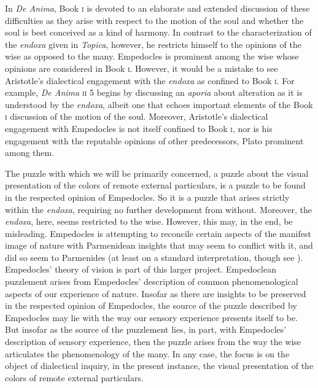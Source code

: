 In \emph{De Anima}, Book \textsc{i} is devoted to an elaborate and extended discussion of these difficulties as they arise with respect to the motion of the soul and whether the soul is best conceived as a kind of harmony. In contrast to the characterization of the \emph{endoxa} given in \emph{Topica}, however, he restricts himself to the opinions of the wise as opposed to the many. Empedocles is prominent among the wise whose opinions are considered in Book \textsc{i}. However, it would be a mistake to see Aristotle's dialectical engagement with the \emph{endoxa} as confined to Book \textsc{i}. For example, \emph{De Anima} \textsc{ii} 5 begins by discussing an \emph{aporia} about alteration as it is understood by the \emph{endoxa}, albeit one that echoes important elements of the Book \textsc{i} discussion of the motion of the soul. Moreover, Aristotle's dialectical engagement with Empedocles is not itself confined to Book \textsc{i}, nor is his engagement with the reputable opinions of other predecessors, Plato prominent among them. 

The puzzle with which we will be primarily concerned, a puzzle about the visual presentation of the colors of remote external particulars, is a puzzle to be found in the respected opinion of Empedocles. So it is a puzzle that arises strictly within the \emph{endoxa}, requiring no further development from without. Moreover, the \emph{endoxa}, here, seems restricted to the wise. However, this may, in the end, be misleading. Empedocles is attempting to reconcile certain aspects of the manifest image of nature with Parmenidean insights that may seem to conflict with it, and did so seem to Parmenides (at least on a standard interpretation, though see \citealt{Palmer:2009qf}). Empedocles' theory of vision is part of this larger project. Empedoclean puzzlement arises from Empedocles' description of common phenomenological aspects of our experience of nature. Insofar as there are insights to be preserved in the respected opinion of Empedocles, the source of the puzzle described by Empedocles may lie with the way our sensory experience presents itself to be. But insofar as the source of the puzzlement lies, in part, with Empedocles' description of sensory experience, then the puzzle arises from the way the wise articulates the phenomenology of the many. In any case, the focus is on the object of dialectical inquiry, in the present instance, the visual presentation of the colors of remote external particulars.

